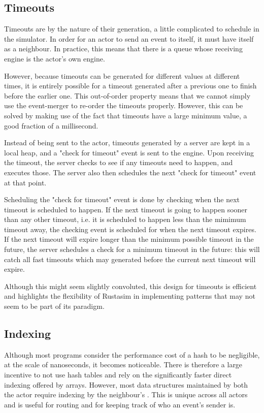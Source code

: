 \subsection{Timeouts} \label{sim-timeouts}

Timeouts are by the nature of their generation, a little complicated to schedule in the simulator.
In order for an actor to send an event to itself, it must have itself as a neighbour.
In practice, this means that there is a queue whose receiving engine is the actor's own engine.

However, because timeouts can be generated for different values at different times, it is entirely possible for a timeout generated after a previous one to finish before the earlier one.
This out-of-order property means that we cannot simply use the event-merger to re-order the timeouts properly.
However, this can be solved by making use of the fact that timeouts have a large minimum value, a good fraction of a millisecond.

Instead of being sent to the actor, timeouts generated by a server are kept in a local heap, and a "check for timeout" event is sent to the engine.
Upon receiving the timeout, the server checks to see if any timeouts need to happen, and executes those.
The server also then schedules the next "check for timeout" event at that point.

Scheduling the "check for timeout" event is done by checking when the next timeout is scheduled to happen.
If the next timeout is going to happen sooner than any other timeout, i.e. it is scheduled to happen less than the mimimum timeout away, the checking event is scheduled for when the next timeout expires.
If the next timeout will expire longer than the minimum possible timeout in the future, the server schedules a check for a minimum timeout in the future: this will catch all fast timeouts which may generated before the current next timeout will expire.

Although this might seem slightly convoluted, this design for timeouts is efficient and highlights the flexibility of Rustasim in implementing patterns that may not seem to be part of its paradigm.


\subsection{Indexing} \label{rustasim-indexing}

Although most programs consider the performance cost of a hash to be negligible, at the scale of nanoseconds, it becomes noticeable.
There is therefore a large incentive to not use hash tables and rely on the significantly faster direct indexing offered by arrays.
However, most data structures maintained by both the actor require indexing by the neighbour's .
This  is unique across all actors and is useful for routing and for keeping track of who an event's sender is.

